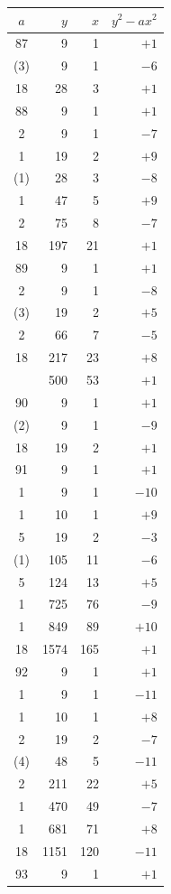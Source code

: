 \documentclass[11pt]{article}
\begin{document}
\begin{center}
\renewcommand{\arraystretch}{1.05}
\begin{tabular}{|c|r|r|r|}
\hline
$a$ & $y$ & $x$ & $y^2 - ax^2$ \\
\hline
87 & 9 & 1 & $+1$ \\
(3) & 9 & 1 & $-6$ \\
18 & 28 & 3 & $+1$ \\
\hline
88 & 9 & 1 & $+1$ \\
2 & 9 & 1 & $-7$ \\
1 & 19 & 2 & $+9$ \\
(1) & 28 & 3 & $-8$ \\
1 & 47 & 5 & $+9$ \\
2 & 75 & 8 & $-7$ \\
18 & 197 & 21 & $+1$ \\
\hline
89 & 9 & 1 & $+1$ \\
2 & 9 & 1 & $-8$ \\
(3) & 19 & 2 & $+5$ \\
2 & 66 & 7 & $-5$ \\
18 & 217 & 23 & $+8$ \\
 & 500 & 53 & $+1$ \\
\hline
90 & 9 & 1 & $+1$ \\
(2) & 9 & 1 & $-9$ \\
18 & 19 & 2 & $+1$ \\
\hline
91 & 9 & 1 & $+1$ \\
1 & 9 & 1 & $-10$ \\
1 & 10 & 1 & $+9$ \\
5 & 19 & 2 & $-3$ \\
(1) & 105 & 11 & $-6$ \\
5 & 124 & 13 & $+5$ \\
1 & 725 & 76 & $-9$ \\
1 & 849 & 89 & $+10$ \\
18 & 1574 & 165 & $+1$ \\
\hline
92 & 9 & 1 & $+1$ \\
1 & 9 & 1 & $-11$ \\
1 & 10 & 1 & $+8$ \\
2 & 19 & 2 & $-7$ \\
(4) & 48 & 5 & $-11$ \\
2 & 211 & 22 & $+5$ \\
1 & 470 & 49 & $-7$ \\
1 & 681 & 71 & $+8$ \\
18 & 1151 & 120 & $-11$ \\
\hline
93 & 9 & 1 & $+1$ \\

\end{tabular}
\end{center}
\end{document}
